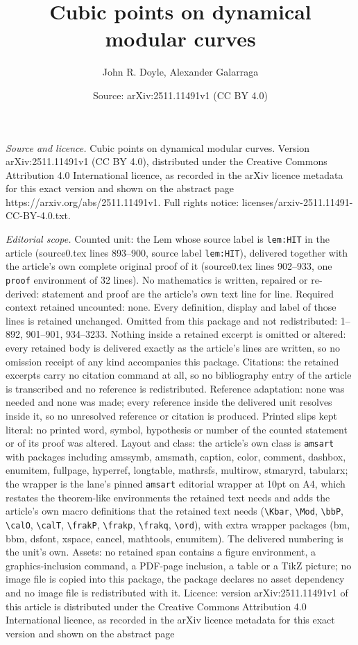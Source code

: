 \documentclass[10pt,a4paper]{amsart}
\title[Cubic points on dynamical modular curves]{Cubic points on dynamical modular curves}
\author{John R. Doyle, Alexander Galarraga}
\date{Source: arXiv:2511.11491v1 (CC BY 4.0)}
\begin{document}
\maketitle

\noindent\emph{Source and licence.} Cubic points on dynamical modular curves. Version arXiv:2511.11491v1 (CC BY 4.0), distributed under the Creative Commons Attribution 4.0 International licence, as recorded in the arXiv licence metadata for this exact version and shown on the abstract page https://arxiv.org/abs/2511.11491v1. Full rights notice: licenses/arxiv-2511.11491-CC-BY-4.0.txt.\par\smallskip

\noindent\textit{Editorial scope.} Counted unit: the Lem whose source label is \texttt{lem:HIT} in the article (source0.tex lines 893--900, source label \texttt{lem:HIT}), delivered together with the article's own complete original proof of it (source0.tex lines 902--933, one \texttt{proof} environment of 32 lines). No mathematics is written, repaired or re-derived: statement and proof are the article's own text line for line. Required context retained uncounted: none. Every definition, display and label of those lines is retained unchanged. Omitted from this package and not redistributed: 1--892, 901--901, 934--3233. Nothing inside a retained excerpt is omitted or altered: every retained body is delivered exactly as the article's lines are written, so no omission receipt of any kind accompanies this package. Citations: the retained excerpts carry no citation command at all, so no bibliography entry of the article is transcribed and no reference is redistributed. Reference adaptation: none was needed and none was made; every reference inside the delivered unit resolves inside it, so no unresolved reference or citation is produced. Printed slips kept literal: no printed word, symbol, hypothesis or number of the counted statement or of its proof was altered. Layout and class: the article's own class is \texttt{amsart} with packages including amssymb, amsmath, caption, color, comment, dashbox, enumitem, fullpage, hyperref, longtable, mathrsfs, multirow, stmaryrd, tabularx; the wrapper is the lane's pinned \texttt{amsart} editorial wrapper at 10pt on A4, which restates the theorem-like environments the retained text needs and adds the article's own macro definitions that the retained text needs (\texttt{\textbackslash Kbar}, \texttt{\textbackslash Mod}, \texttt{\textbackslash bbP}, \texttt{\textbackslash calO}, \texttt{\textbackslash calT}, \texttt{\textbackslash frakP}, \texttt{\textbackslash frakp}, \texttt{\textbackslash frakq}, \texttt{\textbackslash ord}), with extra wrapper packages (bm, bbm, dsfont, xspace, cancel, mathtools, enumitem). The delivered numbering is the unit's own. Assets: no retained span contains a figure environment, a graphics-inclusion command, a PDF-page inclusion, a table or a TikZ picture; no image file is copied into this package, the package declares no asset dependency and no image file is redistributed with it. Licence: version arXiv:2511.11491v1 of this article is distributed under the Creative Commons Attribution 4.0 International licence, as recorded in the arXiv licence metadata for this exact version and shown on the abstract page 
\end{document}
